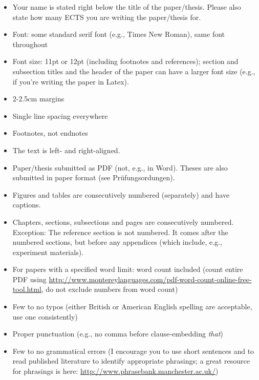 \documentclass[11pt,fleqn,a4paper/thesis]{article}
\newcommand{\6}{\mbox{$[\hspace*{-.6mm}[$}}
\newcommand{\9}{\mbox{$]\hspace*{-.6mm}]$}}
\begin{document}
\begin{itemize}[itemsep=-1pt,leftmargin=2.5ex,topsep=-2pt]

\item Your name is stated right below the title of the paper/thesis. Please also state how many ECTS you are writing the paper/thesis for.

\item Font: some standard serif font (e.g., Times New Roman), same font throughout

\item Font size: 11pt or 12pt (including footnotes and references); section and subsection titles and the header of the paper can have a larger font size (e.g., if you're writing the paper in Latex).

\item 2-2.5cm margins 

\item Single line spacing everywhere

\item Footnotes, not endnotes

\item The text is left- and right-aligned.

\item Paper/thesis submitted as PDF (not, e.g., in Word). Theses are also submitted in paper format (see Pr\"ufungsordungen).

\item Figures and tables are consecutively numbered (separately) and have captions.

\item Chapters, sections, subsections and pages are consecutively numbered. Exception: The reference section is not numbered. It comes after the numbered sections, but before any appendices (which include, e.g., experiment materials).

\item For papers with a specified word limit: word count included (count entire PDF using \url{http://www.montereylanguages.com/pdf-word-count-online-free-tool.html}, do not exclude numbers from word count)

\item Few to no typos (either British or American English spelling are acceptable, use one consistently)

\item Proper punctuation (e.g., no comma before clause-embedding {\em that})

\item Few to no grammatical errors (I encourage you to use short sentences and to read published literature to identify appropriate phrasings; a great resource for phrasings is here: \url{http://www.phrasebank.manchester.ac.uk/})


\end{itemize}
\end{document}
